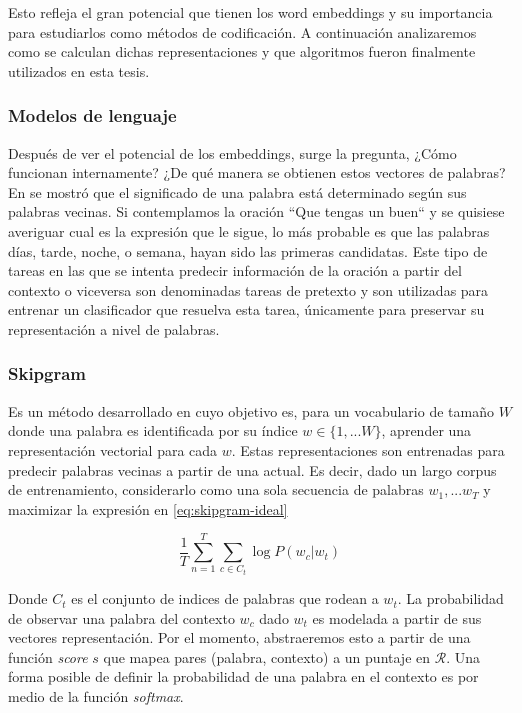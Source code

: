 Esto refleja el gran potencial que tienen los word embeddings y su importancia
para estudiarlos como métodos de codificación. A continuación analizaremos como
se calculan dichas representaciones y que algoritmos fueron finalmente
utilizados en esta tesis.

\subsubsection{Modelos de lenguaje}

Después de ver el potencial de los embeddings, surge la pregunta, ¿Cómo
funcionan internamente? ¿De qué manera se obtienen estos vectores de palabras?
En \citep{firth-57} se mostró que el significado de una palabra está determinado
según sus palabras vecinas. Si contemplamos la oración ``Que tengas un buen`` y
se quisiese averiguar cual es la expresión que le sigue, lo más probable es que
las palabras días, tarde, noche, o semana, hayan sido las primeras candidatas.
Este tipo de tareas en las que se intenta predecir información de la oración a
partir del contexto o viceversa son denominadas tareas de pretexto y son
utilizadas para entrenar un clasificador que resuelva esta tarea, únicamente
para preservar su representación a nivel de palabras.

\subsubsection{Skipgram}

Es un método desarrollado en \citep{Mikolov-2013} cuyo objetivo es, para un
vocabulario de tamaño $W$ donde una palabra es identificada por su índice $w \in
\{1, ... W\}$, aprender una representación vectorial para cada $w$. Estas
representaciones son entrenadas para predecir palabras vecinas a partir de una
actual. Es decir, dado un largo corpus de entrenamiento, considerarlo como una
sola secuencia de palabras $w_1, ... w_T$ y maximizar la expresión en \ref{eq:skipgram-ideal}

\begin{equation} \label{eq:skipgram-ideal}
    \frac{1}{T} \sum_{n=1}^{T}
                    \sum_{c \in C_t} \log P(w_c | w_t)
\end{equation}

Donde $C_t$ es el conjunto de indices de palabras que rodean a $w_t$. La
probabilidad de observar una palabra del contexto $w_c$ dado $w_t$ es modelada a
partir de sus vectores representación. Por el momento, abstraeremos esto a
partir de una función \emph{score} $s$ que mapea pares (palabra, contexto) a un
puntaje en $\mathcal{R}$. Una forma posible de definir la probabilidad de una palabra en
el contexto es por medio de la función \emph{softmax}.

